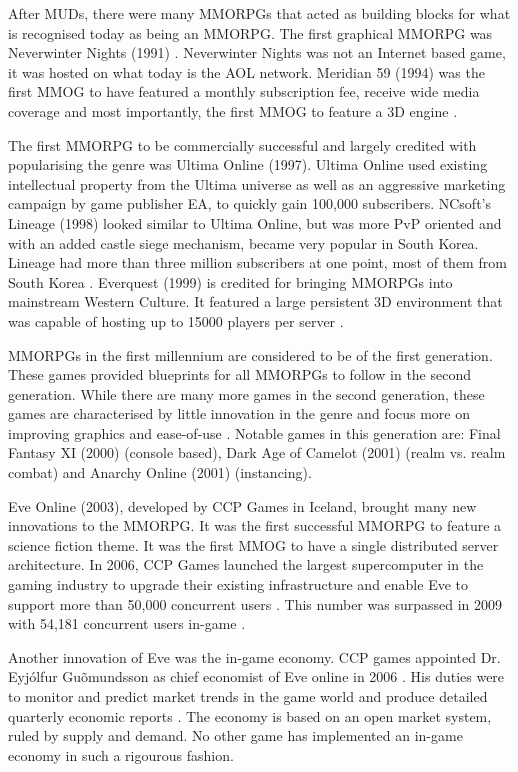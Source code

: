 \documentclass[journal,oneside,a4paper,onecolumn]{IEEEtran}
\begin{document}
After \acp{MUD}, there were many \acp{MMORPG} that acted as building blocks for what is recognised today as being an \ac{MMORPG}. The first graphical \ac{MMORPG} was Neverwinter Nights (1991) \cite{nwn_aol}. Neverwinter Nights was not an Internet based game, it was hosted on what today is the AOL network. Meridian 59 (1994) was the first \ac{MMOG} to have featured a monthly subscription fee, receive wide media coverage and most importantly, the first \ac{MMOG} to feature a 3D engine \cite{meridian59_hist}.

The first \ac{MMORPG} to be commercially successful and largely credited with popularising the genre was Ultima Online (1997). Ultima Online used existing intellectual property from the Ultima universe as well as an aggressive marketing campaign by game publisher EA, to quickly gain 100,000 subscribers. NCsoft's Lineage (1998) looked similar to Ultima Online, but was more \ac{PvP} oriented and with an added castle siege mechanism, became very popular in South Korea. Lineage had more than three million subscribers at one point, most of them from South Korea \cite{mmog_subscriptions}. Everquest (1999) is credited for bringing \acp{MMORPG} into mainstream Western Culture. It featured a large persistent 3D environment that was capable of hosting up to 15000 players per server \cite{everquest2_capacity}.

\acp{MMORPG} in the first millennium are considered to be of the first generation. These games provided blueprints for all \acp{MMORPG}
to follow in the second generation. While there are many more games in the second generation, these games are characterised by little innovation
in the genre and focus more on improving graphics and ease-of-use \cite{mmog_past_present_future}. Notable games in this generation are: Final Fantasy XI (2000) (console based), Dark Age of Camelot (2001) (realm vs. realm combat) and Anarchy Online (2001) (instancing).

Eve Online (2003), developed by CCP Games in Iceland, brought many new innovations to the \ac{MMORPG}. It was the first successful MMORPG to feature a science fiction theme. It was the first MMOG to have a single distributed server architecture. In 2006, CCP Games launched the largest supercomputer in the gaming industry to upgrade their existing infrastructure and enable Eve to support more than 50,000 concurrent users \cite{eve_launces_supcom}. This number was surpassed in 2009 with 54,181 concurrent users in-game \cite{eve_pcu}.

Another innovation of Eve was the in-game economy. CCP games appointed Dr. Eyj\'{o}lfur Gu\~{o}mundsson as chief economist of Eve online in 2006 \cite{eve_economist}. His duties were to monitor and predict market trends in the game world and produce detailed quarterly economic reports \cite{eve_econ_rep}.  The economy is based on an open market system, ruled by supply and demand. No other game has implemented an in-game economy in such a rigourous fashion.
\end{document}
